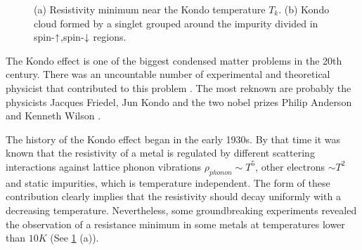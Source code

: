 \begin{figure}[t]
     \centering
    
     \caption{ \label{fig:Kondo} (a) Resistivity minimum near the Kondo temperature $T_k$. (b) Kondo cloud formed by a singlet grouped around the impurity divided in spin-$\uparrow$,spin-$\downarrow$ regions.   \protect{}}
\end{figure}


The Kondo effect is one of the biggest condensed matter problems in the 20th century. There was an uncountable number of experimental and theoretical physicist that contributed to this problem . The most reknown are probably the physicists Jacques Friedel, Jun Kondo and the two nobel prizes Philip Anderson and Kenneth Wilson \citep{hewson_kondo_1997}. 

The history of the Kondo effect began in the early 1930s. By that time it was known that the resistivity of a metal is regulated by different scattering interactions against lattice phonon vibrations $\rho_{phonon} \sim T^5$, other electrons $\sim T^2$ and static impurities, which is temperature independent. The form of these contribution clearly implies that the resistivity should decay uniformly with a decreasing temperature. Nevertheless, some groundbreaking experiments revealed the observation of a resistance minimum in some metals at temperatures lower than $10K$ \cite{Kondo_deBoer1934}(See \ref{fig:Kondo} (a)). 

